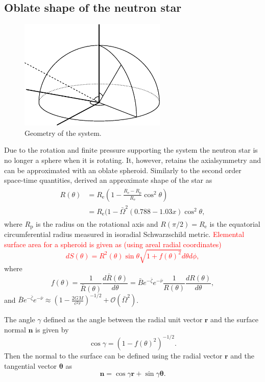 \documentclass[iop, usenatbib]{emulateapj}
\newcommand{\be}{\begin{equation}}
\newcommand{\ee}{\end{equation}}
\renewcommand{\vec}[1]{\ensuremath{\boldsymbol{#1}}​}
\newcommand{\red}[1]{\textcolor{red}{#1}}
\newcommand{\Req}{\ensuremath{R_{\mathrm{e}}}}
\newcommand{\sch}{Schwarzschild }
\newcommand{\Ob}{\ensuremath{\bar{\Omega}}}
\newcommand{\nub}{\ensuremath{\bar{\nu}}}
\newcommand{\zetab}{\ensuremath{\bar{\zeta}}}
\newcommand{\Bb}{\ensuremath{\bar{B}}}
\begin{document}
\subsection{Oblate shape of the neutron star}

\begin{figure}
\centering
\includegraphics[width=7cm]{figs/fig1.eps}
\caption{\label{fig:geom}
  Geometry of the system.
}
\end{figure}


Due to the rotation and finite pressure supporting the system the neutron star is no longer a sphere when it is rotating.
It, however, retains the axialsymmetry and can be approximated with an oblate spheroid.
Similarly to the second order space-time quantities, \citet{aGM14} derived an approximate shape of the star as
\begin{align}\begin{split}
    R(\theta) &= \Req \left( 1 - \frac{\Req - R_{\mathrm{p}}}{\Req} \cos^2\theta \right) \\
              &= \Req (1-\Ob^2 (0.788 - 1.03x) \cos^2 \theta,
\end{split}\end{align}
where $R_{\mathrm{p}}$ is the radius on the rotational axis and $R(\pi/2) = \Req$ is the equatorial circumferential radius measured in isoradial \sch metric. 
\red{Elemental surface area for a spheroid is given as (using areal radial coordinates)
\be
dS(\theta) = R^2(\theta) \sin\theta \sqrt{1 + f(\theta)^2}d\theta d\phi,
\ee
}
where
\be
f(\theta) = \frac{1}{\bar{R}(\theta)} \frac{d \bar{R}(\theta)}{d \theta} = \Bb e^{-\zetab} e^{-\nub} \frac{1}{R(\theta)} \frac{dR(\theta)}{d\theta}, 
\ee
and $\Bb e^{-\zetab} e^{-\nub} \approx (1-\frac{2 G M}{c^2 r})^{-1/2} + \mathcal{O}(\Ob^2)$.


The angle $\gamma$ defined as the angle between the radial unit vector $\vec{r}$ and the surface normal $\vec{n}$ is given by
\be
\cos\gamma = (1 - f(\theta)^2)^{-1/2}.
\ee
Then the normal to the surface can be defined using the radial vector $\vec{r}$ and the tangential vector $\vec{\theta}$ as
\be
\vec{n} = \cos\gamma \vec{r} + \sin\gamma \vec{\theta}.
\ee
\end{document}
